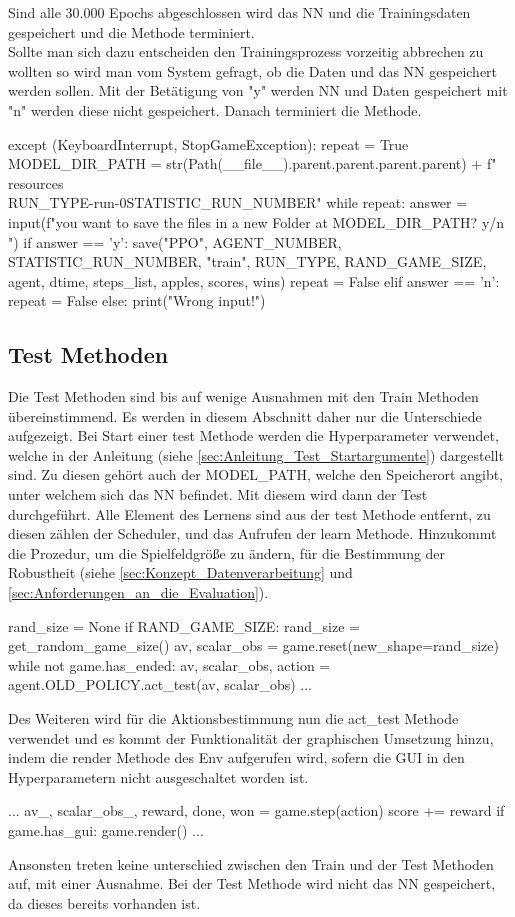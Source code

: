 Sind alle 30.000 Epochs abgeschlossen wird das NN und die Trainingsdaten gespeichert und die Methode terminiert.\\
Sollte man sich dazu entscheiden den Trainingsprozess vorzeitig abbrechen zu wollten so wird man vom System gefragt, ob die Daten und das NN gespeichert werden sollen. Mit der Betätigung von "y" werden NN und Daten gespeichert mit "n" werden diese nicht gespeichert. Danach terminiert die Methode.
\begin{python}
	except (KeyboardInterrupt, StopGameException):
		repeat = True
		MODEL_DIR_PATH = str(Path(__file__).parent.parent.parent.parent) + f"\\resources\\{RUN_TYPE}-run-0{STATISTIC_RUN_NUMBER}"
		while repeat:
			answer = input(f"\nDo you want to save the files in a new Folder at {MODEL_DIR_PATH}? y/n \n")
			if answer == 'y':
				save("PPO", AGENT_NUMBER, STATISTIC_RUN_NUMBER, "train", RUN_TYPE, RAND_GAME_SIZE, agent, dtime,
				steps_list, apples, scores, wins)
				repeat = False
			elif answer == 'n':
				repeat = False
			else:
				print("Wrong input!")
\end{python}

\subsection{Test Methoden}
Die Test Methoden sind bis auf wenige Ausnahmen mit den Train Methoden übereinstimmend. Es werden in diesem Abschnitt daher nur die Unterschiede aufgezeigt. Bei Start einer test Methode werden die Hyperparameter verwendet, welche in der Anleitung (siehe \ref{sec:Anleitung_Test_Startargumente}) dargestellt sind. Zu diesen gehört auch der MODEL\_PATH, welche den Speicherort angibt, unter welchem sich das NN befindet. Mit diesem wird dann der Test durchgeführt. Alle Element des Lernens sind aus der test Methode entfernt, zu diesen zählen der Scheduler, und das Aufrufen der learn Methode. Hinzukommt die Prozedur, um die Spielfeldgröße zu ändern, für die Bestimmung der Robustheit (siehe \ref{sec:Konzept_Datenverarbeitung} und \ref{sec:Anforderungen_an_die_Evaluation}). 
\begin{python}
	rand_size = None
	if RAND_GAME_SIZE:
		rand_size = get_random_game_size()
	av, scalar_obs = game.reset(new_shape=rand_size)
	while not game.has_ended:
		av, scalar_obs, action = agent.OLD_POLICY.act_test(av, scalar_obs)
		...
		
\end{python}
Des Weiteren wird für die Aktionsbestimmung nun die act\_test Methode verwendet und es kommt der Funktionalität der graphischen Umsetzung hinzu, indem die render Methode des Env aufgerufen wird, sofern die GUI in den Hyperparametern nicht ausgeschaltet worden ist.
\begin{python}
	...
	av_, scalar_obs_, reward, done, won = game.step(action)
	score += reward
	if game.has_gui:
		game.render()
	...
\end{python}
Ansonsten treten keine unterschied zwischen den Train und der Test Methoden auf, mit einer Ausnahme. Bei der Test Methode wird nicht das NN gespeichert, da dieses bereits vorhanden ist.

